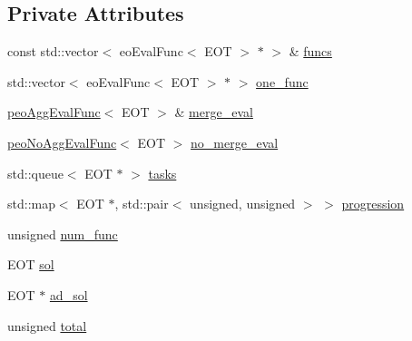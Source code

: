\subsection*{Private Attributes}
\begin{CompactItemize}
\item 
const std::vector$<$ eo\-Eval\-Func$<$ EOT $>$ $\ast$ $>$ \& \hyperlink{classpeoPopEval_5862b3661c5b0531d55870b5f3881d1e}{funcs}
\item 
\hypertarget{classpeoPopEval_4c563a67b776d97b25a05013ddc99921}{
std::vector$<$ eo\-Eval\-Func$<$ EOT $>$ $\ast$ $>$ \hyperlink{classpeoPopEval_4c563a67b776d97b25a05013ddc99921}{one\_\-func}}
\label{classpeoPopEval_4c563a67b776d97b25a05013ddc99921}

\item 
\hypertarget{classpeoPopEval_765f1941fcb630b6ed5c4cf0e1e845f9}{
\hyperlink{classpeoAggEvalFunc}{peo\-Agg\-Eval\-Func}$<$ EOT $>$ \& \hyperlink{classpeoPopEval_765f1941fcb630b6ed5c4cf0e1e845f9}{merge\_\-eval}}
\label{classpeoPopEval_765f1941fcb630b6ed5c4cf0e1e845f9}

\item 
\hypertarget{classpeoPopEval_8558f626aca54bdc3bbeb78c774ca4ef}{
\hyperlink{classpeoNoAggEvalFunc}{peo\-No\-Agg\-Eval\-Func}$<$ EOT $>$ \hyperlink{classpeoPopEval_8558f626aca54bdc3bbeb78c774ca4ef}{no\_\-merge\_\-eval}}
\label{classpeoPopEval_8558f626aca54bdc3bbeb78c774ca4ef}

\item 
\hypertarget{classpeoPopEval_fc1e9fba1a220550c332c70250f775cc}{
std::queue$<$ EOT $\ast$ $>$ \hyperlink{classpeoPopEval_fc1e9fba1a220550c332c70250f775cc}{tasks}}
\label{classpeoPopEval_fc1e9fba1a220550c332c70250f775cc}

\item 
\hypertarget{classpeoPopEval_25646d6ec0df9f281b17d96956d2201f}{
std::map$<$ EOT $\ast$, std::pair$<$ unsigned, unsigned $>$ $>$ \hyperlink{classpeoPopEval_25646d6ec0df9f281b17d96956d2201f}{progression}}
\label{classpeoPopEval_25646d6ec0df9f281b17d96956d2201f}

\item 
\hypertarget{classpeoPopEval_a6753e36522ece615fb44f91b2986dc6}{
unsigned \hyperlink{classpeoPopEval_a6753e36522ece615fb44f91b2986dc6}{num\_\-func}}
\label{classpeoPopEval_a6753e36522ece615fb44f91b2986dc6}

\item 
\hypertarget{classpeoPopEval_d2bb78c4092b2f57a70fa6f90354ea91}{
EOT \hyperlink{classpeoPopEval_d2bb78c4092b2f57a70fa6f90354ea91}{sol}}
\label{classpeoPopEval_d2bb78c4092b2f57a70fa6f90354ea91}

\item 
\hypertarget{classpeoPopEval_140a0ffb2a481238dde05e7f0324d516}{
EOT $\ast$ \hyperlink{classpeoPopEval_140a0ffb2a481238dde05e7f0324d516}{ad\_\-sol}}
\label{classpeoPopEval_140a0ffb2a481238dde05e7f0324d516}

\item 
\hypertarget{classpeoPopEval_83b38d0977e5c8666c5aa5293c53bb3e}{
unsigned \hyperlink{classpeoPopEval_83b38d0977e5c8666c5aa5293c53bb3e}{total}}
\label{classpeoPopEval_83b38d0977e5c8666c5aa5293c53bb3e}

\end{CompactItemize}


